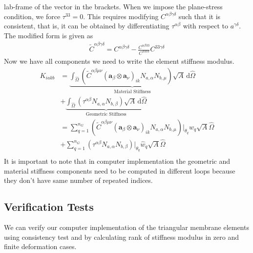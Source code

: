 \documentclass[../main.tex]{subfiles}
\begin{document}
lab-frame of the vector in the brackets. When we impose the
plane-stress condition, we force $\tau^{33} = 0$. This requires
modifying $C^{\alpha\beta\gamma\delta}$ such that it is consistent,
that is, it can be obtained by differentiating $\tau^{\alpha\beta}$
with respect to $a^{\gamma\delta}$. The modified form is given as
\begin{align*}
  \tilde{C}^{\alpha\beta\gamma\delta} = C^{\alpha\beta\gamma\delta} - \frac{C^{\alpha\beta33}}{C^{3333}}C^{33\gamma\delta}
\end{align*}
Now we have all components we need to write the element stiffness
modulus.
\begin{align*}
  K_{iakb} &= \underbrace{\int_{\hat{\Omega}}\! \left(\tilde{C}^{\alpha\beta\mu\nu}(\mathbf{a}_\beta\otimes\mathbf{a}_\nu)_{ik}N_{a,\alpha}N_{b,\mu}\right)\sqrt{A} \,\mathrm{d}\hat{\Omega}}_{\text{Material Stiffness}}\\
           & +  \underbrace{\int_{\hat{\Omega}}\! \left(\tau^{\alpha\beta}N_{a,\alpha}N_{b,\beta}\right)\sqrt{A} \, \mathrm{d}\hat{\Omega}}_{\text{Geometric Stiffness}}\\
           &=\sum_{q=1}^{n_G}\left(\tilde{C}^{\alpha\beta\mu\nu}(\mathbf{a}_\beta\otimes\mathbf{a}_\nu)_{ik}N_{a,\alpha}N_{b,\mu}\right)\bigg\lvert_{\theta_q}\hat{w}_q\sqrt{A}\hat{\Omega}\\
           & +  \sum_{q=1}^{n_G}\left(\tau^{\alpha\beta}N_{a,\alpha}N_{b,\beta}\right)\bigg\lvert_{\theta_q}\hat{w}_{q}\sqrt{A}\hat{\Omega}\\
\end{align*}
It is important to note that in computer implementation the geometric
and material stiffness components need to be computed in different
loops because they don't have same number of repeated indices.
\subsection{Verification Tests}
We can verify our computer implementation of the triangular membrane
elements using consistency test and by calculating rank of stiffness
modulus in zero and finite deformation cases.
\end{document}
